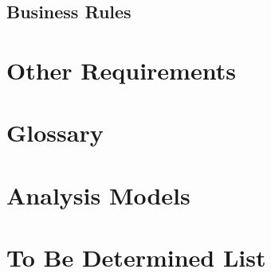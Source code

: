 \section{Business Rules}

\chapter{Other Requirements}
\label{Other Requirements}

\begin{appendices}
\chapter{Glossary}
\chapter{Analysis Models}
\chapter{To Be Determined List}


\end{appendices}


